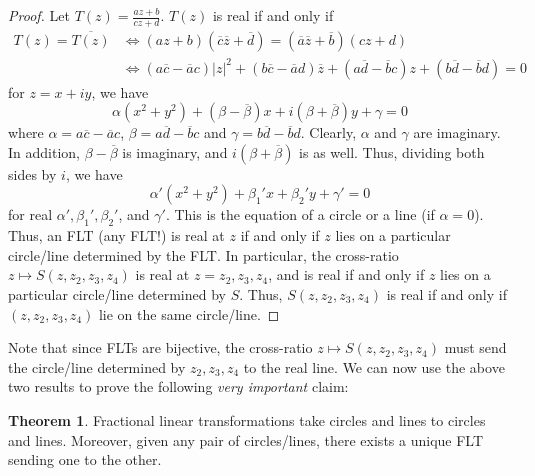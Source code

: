 \documentclass[aps,pra,showpacs,notitlepage,onecolumn,superscriptaddress,nofootinbib]{revtex4-1}
\theoremstyle{definition}
\newtheorem{theorem}{Theorem}[section]
\begin{document}
\begin{proof}
  Let $T(z) = \frac{az + b}{cz + d}$. $T(z)$ is real if and only if
  \begin{align}
    T(z) = \overline{T(z)} & \Longleftrightarrow (az + b)(\overline{c} \overline{z} + \overline{d}) = (\overline{a} \overline{z} + \overline{b})(cz + d)
    \\ & \Longleftrightarrow (a\overline{c} - \overline{a} c) |z|^2 + (b\overline{c} - \overline{a} d) \overline{z} + (a \overline{d} - \overline{b} c) z + (b\overline{d} - \overline{b} d) = 0
  \end{align}
  for $z = x + iy$, we have
  \begin{equation}
    \alpha (x^2 + y^2) + (\beta - \overline{\beta}) x + i (\beta + \overline{\beta}) y + \gamma = 0
  \end{equation}
  where $\alpha = a\overline{c} - \overline{a} c$, $\beta = a \overline{d} - \overline{b} c$ and $\gamma = b\overline{d} - \overline{b} d$. Clearly, $\alpha$ and $\gamma$ are imaginary. In addition,
  $\beta - \overline{\beta}$ is imaginary, and $i (\beta + \overline{\beta})$ is as well. Thus, dividing both sides by $i$, we have
  \begin{equation}
    \alpha' (x^2 + y^2) + \beta_1' x + \beta_2' y + \gamma' = 0
  \end{equation}
  for real $\alpha', \beta_1', \beta_2'$, and $\gamma'$. This is the equation of a circle or a line (if $\alpha = 0$). Thus, an FLT (any FLT!) is real at $z$ if and only if $z$ lies on a particular circle/line determined
  by the FLT. In particular, the cross-ratio $z \mapsto S(z, z_2, z_3, z_4)$ is real at $z = z_2, z_3, z_4$, and is real if and only if $z$ lies on a particular circle/line determined by $S$. Thus, $S(z, z_2, z_3, z_4)$ is real
  if and only if $(z, z_2, z_3, z_4)$ lie on the same circle/line.
\end{proof}

\noindent Note that since FLTs are bijective, the cross-ratio $z \mapsto S(z, z_2, z_3, z_4)$ must send the circle/line determined by $z_2, z_3, z_4$ to the real line. We can now use the above two results to prove the following \emph{very important} claim:

\begin{theorem}
  Fractional linear transformations take circles and lines to circles and lines. Moreover, given any pair of circles/lines, there exists a unique FLT sending one
  to the other.
\end{theorem}
\end{document}
